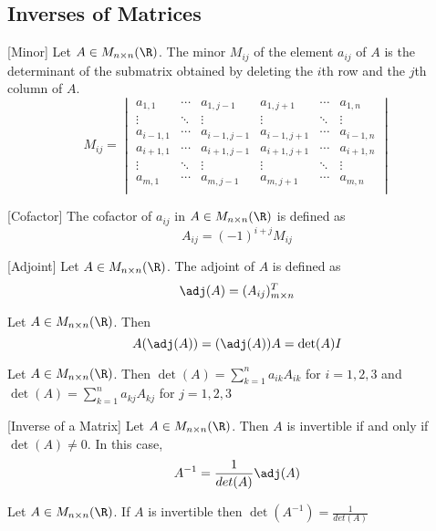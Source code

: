 \subsection{Inverses of Matrices}
\begin{defn}{}{}[Minor] Let $A\in M_{n\times n}(\R)$. The minor $M_{ij}$ of the element $a_{ij}$ of $A$ is the determinant of the submatrix obtained by deleting the $i$th row and the $j$th column of $A$. $$M_{ij}=
\begin{vmatrix}
a_{1,1} & \cdots & a_{1,j-1} & a_{1,j+1} & \cdots & a_{1,n}\\
\vdots & \ddots & \vdots & \vdots & \ddots & \vdots\\
a_{i-1,1} & \cdots & a_{i-1,j-1} & a_{i-1,j+1} & \cdots & a_{i-1,n}\\
a_{i+1,1} & \cdots & a_{i+1,j-1} & a_{i+1,j+1} & \cdots & a_{i+1,n}\\
\vdots & \ddots & \vdots & \vdots & \ddots & \vdots\\
a_{m,1} & \cdots & a_{m,j-1} & a_{m,j+1} & \cdots & a_{m,n}\\
\end{vmatrix}$$
\end{defn}

\begin{defn}{}{}[Cofactor] The cofactor of $a_{ij}$ in $A\in M_{n\times n}(\R)$ is defined as $$A_{ij}=(-1)^{i+j}M_{ij}$$
\end{defn}

\begin{defn}{}{}[Adjoint] Let $A\in M_{n\times n}(\R)$. The adjoint of $A$ is defined as $$\adj(A)=(A_{ij})_{m\times n}^T$$
\end{defn}

\begin{thm}{}{} Let $A\in M_{n\times n}(\R)$. Then $$A(\adj(A))=(\adj(A))A=\det(A)I$$
\end{thm}

\begin{prp}{}{} Let $A\in M_{n\times n}(\R)$. Then $\det(A)=\sum_{k=1}^{n}a_{ik}A_{ik}$ for $i=1,2,3$ and $\det(A)=\sum_{k=1}^{n}a_{kj}A_{kj}$ for $j=1,2,3$
\end{prp}

\begin{thm}{}{}[Inverse of a Matrix] Let $A\in M_{n\times n}(\R)$. Then $A$ is invertible if and only if $\det(A)\neq0$. In this case, $$A^{-1}=\frac{1}{det(A)}\adj(A)$$
\end{thm}

\begin{prp}{}{} Let $A\in M_{n\times n}(\R)$. If $A$ is invertible then $\det(A^{-1})=\frac{1}{det(A)}$
\end{prp}

